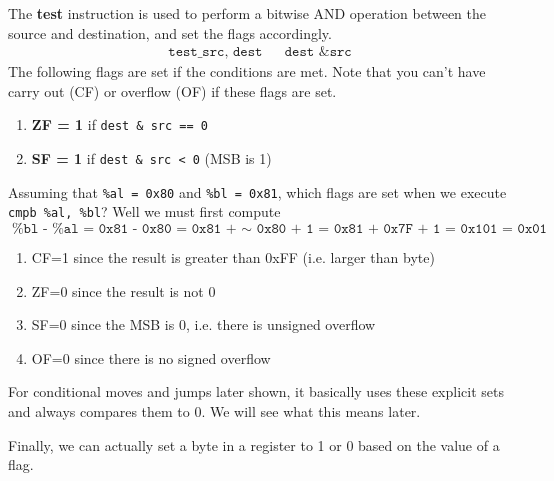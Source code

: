   \begin{definition}[Test]
    \label{def:test}
    The \textbf{test} instruction is used to perform a bitwise AND operation between the source and destination, and set the flags accordingly. 
    \begin{align*}
      \texttt{test\_ src, dest} && \texttt{dest \& src} 
    \end{align*}
    The following flags are set if the conditions are met. Note that you can't have carry out (CF) or overflow (OF) if these flags are set. 
    \begin{enumerate}
      \item \textbf{ZF = 1} if \texttt{dest \& src == 0} 
      \item \textbf{SF = 1} if \texttt{dest \& src < 0} (MSB is 1) 
    \end{enumerate}
  \end{definition}

  \begin{example}[Compare]
    \label{ex:compare}
 
    Assuming that \texttt{\%al = 0x80} and \texttt{\%bl = 0x81}, which flags are set when we execute \texttt{cmpb \%al, \%bl}? Well we must first compute 
    \begin{equation}
      \texttt{\%bl - \%al = 0x81 - 0x80 = 0x81 + $\sim$ 0x80 + 1 = 0x81 + 0x7F + 1 = 0x101 = 0x01}
    \end{equation}
    \begin{enumerate}
      \item CF=1 since the result is greater than 0xFF (i.e. larger than byte) 
      \item ZF=0 since the result is not 0 
      \item SF=0 since the MSB is 0, i.e. there is unsigned overflow
      \item OF=0 since there is no signed overflow
    \end{enumerate}
  \end{example}

  For conditional moves and jumps later shown, it basically uses these explicit sets and always compares them to $0$. We will see what this means later. 

  Finally, we can actually set a byte in a register to 1 or 0 based on the value of a flag. 

  \begin{definition}[Set]
    \label{def:set}
    
  \end{definition}

